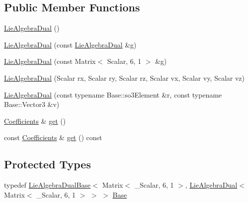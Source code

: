 \subsection*{Public Member Functions}
\begin{DoxyCompactItemize}
\item 
\hyperlink{class_lie_algebra_dual_3_01_matrix_3_01___scalar_00_016_00_011_01_4_01_4_a1b04b5f4e09a023256b0056877daac46}{Lie\+Algebra\+Dual} ()
\item 
\hyperlink{class_lie_algebra_dual_3_01_matrix_3_01___scalar_00_016_00_011_01_4_01_4_a798a3a9d717849210ee5d393edf85646}{Lie\+Algebra\+Dual} (const \hyperlink{class_lie_algebra_dual}{Lie\+Algebra\+Dual} \&g)
\item 
\hyperlink{class_lie_algebra_dual_3_01_matrix_3_01___scalar_00_016_00_011_01_4_01_4_a6250264c65f7681975a5683570e258e1}{Lie\+Algebra\+Dual} (const Matrix$<$ Scalar, 6, 1 $>$ \&g)
\item 
\hyperlink{class_lie_algebra_dual_3_01_matrix_3_01___scalar_00_016_00_011_01_4_01_4_a61842ce986294ff68257c54e8ebe6e9f}{Lie\+Algebra\+Dual} (Scalar rx, Scalar ry, Scalar rz, Scalar vx, Scalar vy, Scalar vz)
\item 
\hyperlink{class_lie_algebra_dual_3_01_matrix_3_01___scalar_00_016_00_011_01_4_01_4_ae16baa5a11793aa9621e8d72383834fe}{Lie\+Algebra\+Dual} (const typename Base\+::so3\+Element \&r, const typename Base\+::\+Vector3 \&v)
\item 
\hyperlink{class_lie_algebra_dual_3_01_matrix_3_01___scalar_00_016_00_011_01_4_01_4_ae22cd667e4ac77db27cc018db14003bd}{Coefficients} \& \hyperlink{class_lie_algebra_dual_3_01_matrix_3_01___scalar_00_016_00_011_01_4_01_4_a4ec6e6c98b92fd7f55e065cc122ddcfc}{get} ()
\item 
const \hyperlink{class_lie_algebra_dual_3_01_matrix_3_01___scalar_00_016_00_011_01_4_01_4_ae22cd667e4ac77db27cc018db14003bd}{Coefficients} \& \hyperlink{class_lie_algebra_dual_3_01_matrix_3_01___scalar_00_016_00_011_01_4_01_4_ae618e2d8cc6c4f7bcfa1b237b1dd7654}{get} () const
\end{DoxyCompactItemize}
\subsection*{Protected Types}
\begin{DoxyCompactItemize}
\item 
typedef \hyperlink{class_lie_algebra_dual_base}{Lie\+Algebra\+Dual\+Base}$<$ Matrix$<$ \+\_\+\+Scalar, 6, 1 $>$, \hyperlink{class_lie_algebra_dual}{Lie\+Algebra\+Dual}$<$ Matrix$<$ \+\_\+\+Scalar, 6, 1 $>$ $>$ $>$ \hyperlink{class_lie_algebra_dual_3_01_matrix_3_01___scalar_00_016_00_011_01_4_01_4_a45aa12118237d9a3de26fc61791f31bf}{Base}
\end{DoxyCompactItemize}
